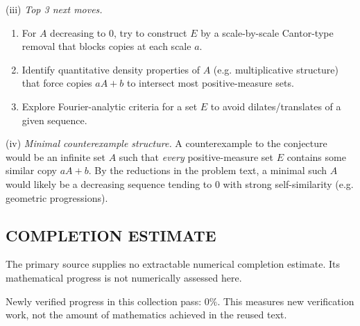 (iii) \emph{Top 3 next moves.}
\begin{enumerate}
\item For $A$ decreasing to $0$, try to construct $E$ by a scale-by-scale Cantor-type removal that blocks copies at each scale $a$.
\item Identify quantitative density properties of $A$ (e.g. multiplicative structure) that force copies $aA+b$ to intersect most positive-measure sets.
\item Explore Fourier-analytic criteria for a set $E$ to avoid dilates/translates of a given sequence.
\end{enumerate}

(iv) \emph{Minimal counterexample structure.}
A counterexample to the conjecture would be an infinite set $A$ such that \emph{every} positive-measure set $E$ contains some similar copy $aA+b$.  By the reductions in the problem text, a minimal such $A$ would likely be a decreasing sequence tending to $0$ with strong self-similarity (e.g. geometric progressions).




\subsection*{COMPLETION ESTIMATE}
The primary source supplies no extractable numerical completion estimate. Its mathematical progress is not numerically assessed here.

Newly verified progress in this collection pass: $0\%$. This measures new verification work, not the amount of mathematics achieved in the reused text.
